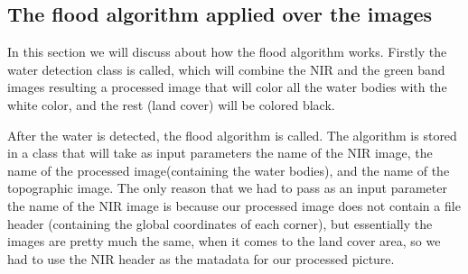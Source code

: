 \documentclass[12pt, a4paper]{report}
\begin{document}
\subsection{The flood algorithm applied over the images}

\quad
In this section we will discuss about how the flood algorithm works. Firstly the water detection class is called, which will combine the NIR and the green band images resulting a processed image that will color all the water bodies with the white color, and the rest (land cover) will be colored black.
\par 
 After the water is detected, the flood algorithm is called. The algorithm is stored in a class that will take as input parameters the name of the NIR image, the name of the processed image(containing the water bodies), and the name of the topographic image. The only reason that we had to pass as an input parameter the name of the NIR image is because our processed image does not contain a file header (containing the global coordinates of each corner), but essentially the images are pretty much the same, when it comes to the land cover area, so we had to use the NIR header as the matadata for our processed picture.
\par
\end{document}
